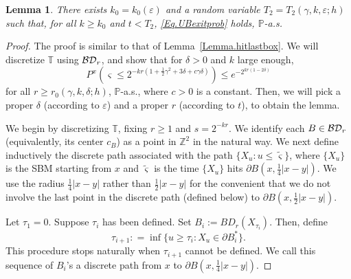 \documentclass[11pt]{article}
\newtheorem{lemma}[theorem]{Lemma}
\theoremstyle{definition}
\def \BD {{\cal BD}}
\def \e {\varepsilon}
\def \d {\delta}
\def \P {{\mathbb{P}}}
\def \T {{\mathbb{T}}}
\def \Z {{\mathbb{Z}}}
\begin{document}
 \begin{lemma} \label{Lemma.hitprobub}
There exists $k_0 = k_0 (\e)$ and a random variable $T_2=T_2(\gamma,k,\e;h)$
such that, for all  $k \ge k_0$ and $t<T_2$,
\eqref{Eq.UBexitprob} holds, $\P$-a.s.
  \end{lemma}
 \begin{proof}
The proof is similar to that of Lemma~\ref{Lemma.hitlastbox}.
We will discretize $\T$ using $\BD_r$, and show that for $\d > 0$ and $k$ large enough,
 \begin{equation} \label{Eq.ubrlarge}
P^x ( \varsigma \le  2^{- kr( 1 + \frac 1 2 \gamma^2  + 3 \d + c \gamma \d )} ) \le e^{-2^{kr(1-2\d)}}
 \end{equation}
for all $r \ge r_0 (\gamma, k, \d ; h)$, $\P$-a.s., where $c>0$ is a constant. Then, we will pick a proper $\d$ (according to $\e$) and a proper $r$ (according to $t$), to obtain the lemma.

We begin by discretizing $\T$, fixing
$r \ge 1$ and $s=2^{-kr}$. We identify each $B \in \BD_r$
(equivalently, its center $c_B$) as a point in $\Z^2$ in the natural
way.
We next define inductively
the discrete path associated with the path
$\{ X_u : u \le \tilde \varsigma \}$, where $\{ X_u \}$ is
the SBM starting from $x$ and $\tilde \varsigma$ is the time
$\{ X_u \}$ hits $\partial B(x, \frac 1 4 |x-y|)$. We use the radius $\frac 1 4 |x-y|$ rather than $\frac 1 2 |x-y|$ for the convenient that we do not involve the last point in the discrete path (defined below) to $\partial B(x, \frac 1 2 |x-y|)$.

Let $\tau_1 = 0$. Suppose $\tau_i$ has been defined.
Set $B_i := BD_r (X_{\tau_i})$. Then, define
$$\tau_{i+1} : = \inf \{ u \ge \tau_i : X_u \in \partial B_i^{*} \}.$$
This procedure stops naturally when $\tau_{i+1}$ cannot be defined.
We call this sequence of $B_i$'s a discrete path from $x$ to $\partial B(x, \frac 1 4 |x-y|)$.


\end{proof}
\end{document}
